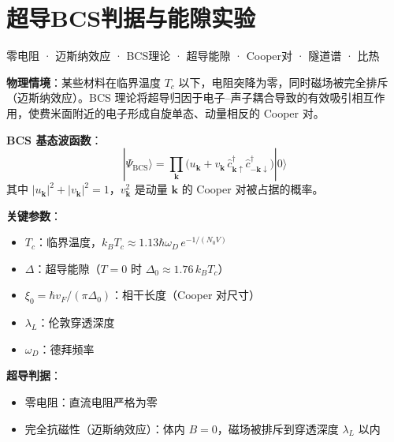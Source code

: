 
\section{超导BCS判据与能隙实验}
\label{sec:superconductivity-bcs}

\begin{tipbox}[关键词标签]
零电阻 · 迈斯纳效应 · BCS理论 · 超导能隙 · Cooper对 · 隧道谱 · 比热
\end{tipbox}

\begin{modelbox}[模型：超导BCS理论与能隙]
\textbf{物理情境}：某些材料在临界温度 $T_c$ 以下，电阻突降为零，同时磁场被完全排斥（迈斯纳效应）。BCS 理论将超导归因于电子--声子耦合导致的有效吸引相互作用，使费米面附近的电子形成自旋单态、动量相反的 Cooper 对。

\textbf{BCS 基态波函数}：
\[
|\Psi_{\text{BCS}}\rangle=\prod_{\mathbf{k}}\bigl(u_{\mathbf{k}}+v_{\mathbf{k}}\,\hat{c}_{\mathbf{k}\uparrow}^\dagger\hat{c}_{-\mathbf{k}\downarrow}^\dagger\bigr)|0\rangle
\]
其中 $|u_{\mathbf{k}}|^2+|v_{\mathbf{k}}|^2=1$，$v_{\mathbf{k}}^2$ 是动量 $\mathbf{k}$ 的 Cooper 对被占据的概率。

\textbf{关键参数}：
\begin{itemize}[nosep]
    \item $T_c$：临界温度，$k_BT_c\approx1.13\hbar\omega_D\,e^{-1/(N_0V)}$
    \item $\Delta$：超导能隙（$T=0$ 时 $\Delta_0\approx1.76\,k_BT_c$）
    \item $\xi_0=\hbar v_F/(\pi\Delta_0)$：相干长度（Cooper 对尺寸）
    \item $\lambda_L$：伦敦穿透深度
    \item $\omega_D$：德拜频率
\end{itemize}

\textbf{超导判据}：
\begin{itemize}[nosep]
    \item 零电阻：直流电阻严格为零
    \item 完全抗磁性（迈斯纳效应）：体内 $B=0$，磁场被排斥到穿透深度 $\lambda_L$ 以内
\end{itemize}
\end{modelbox}

